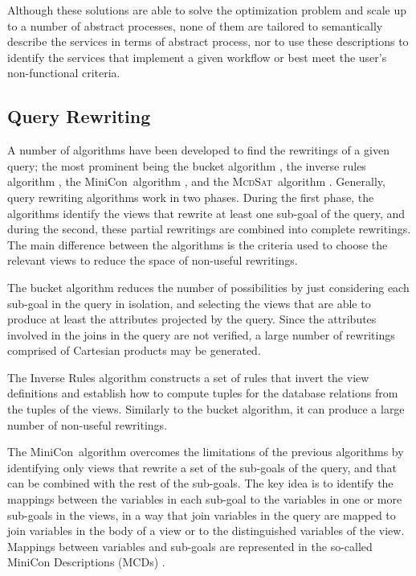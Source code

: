 \documentclass{llncs}
\newcommand{\mcdsat}{\textsc{McdSat}}
\newcommand{\minicon}{{MiniCon}}
\begin{document}
Although these solutions are able to solve the optimization problem and scale up
to a number of abstract processes, none of them are tailored to semantically describe
the services in terms of abstract process, nor to use these descriptions to 
identify the services that implement a given workflow or best meet the user's
non-functional criteria.

\subsection{Query Rewriting}

A number of algorithms have been developed to find the rewritings of a given query;
the most prominent being the bucket algorithm \cite{levy:bucket}, the inverse rules
algorithm \cite{pods:DuschkaG97,Qian96}, the \minicon\ algorithm \cite{pottinger:minicon},
and the \mcdsat\ algorithm \cite{arvelo:aaai06}.
Generally, query rewriting algorithms work in two phases. During the first phase,
the algorithms identify the views that rewrite at least one sub-goal of the query, and
during the second, these partial rewritings are combined into complete rewritings.
The main difference between the algorithms is the criteria used to choose the relevant
views to reduce the space of non-useful rewritings.

The bucket algorithm reduces the number of possibilities by just considering each
sub-goal in the query in isolation, and selecting the views that are able to produce
at least the attributes projected by the query. Since the attributes involved in the
joins in the query are not verified, a large number of rewritings comprised of Cartesian
products may be generated. 	

The Inverse Rules algorithm constructs a set of rules that invert the view definitions
and establish how to compute tuples for the database relations from the tuples of the
views. Similarly to the bucket algorithm, it can produce a large number of non-useful
rewritings. 

The \minicon\ algorithm overcomes the limitations of the previous algorithms by identifying
only views that rewrite a set of the sub-goals of the query, and that can be combined with
the rest of the sub-goals. The key idea is to identify the mappings between the variables in
each sub-goal to the variables in one or more sub-goals in the views, in a way
that join variables in the query are mapped to join variables in the body of a view or to
the distinguished variables of the view. Mappings between variables and sub-goals are
represented in the so-called MiniCon Descriptions (MCDs) \cite{pottinger:minicon}.
\end{document}
